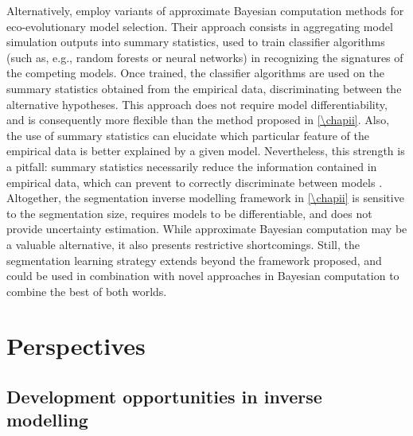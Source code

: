 % 
Alternatively, \cite{Sukumaran2016,Skeels2019,Skeels2022} employ variants of approximate Bayesian computation methods \citep{Csillery2010} for eco-evolutionary model selection. Their approach consists in aggregating model simulation outputs into summary statistics, used to train classifier algorithms (such as, e.g., random forests or neural networks) in recognizing the signatures of the competing models. Once trained, the classifier algorithms are used on the summary statistics obtained from the empirical data, discriminating between the alternative hypotheses. 
% 
This approach does not require model differentiability, and is consequently more flexible than the method proposed in \cref{\chapii}. Also, the use of summary statistics can elucidate which particular feature of the empirical data is better explained by a given model. 
% 
Nevertheless, this strength is a pitfall: summary statistics necessarily reduce the information contained in empirical data, which can prevent to correctly discriminate between models \citep{Csillery2010}.
% 
Altogether, the segmentation inverse modelling framework in \cref{\chapii} is sensitive to the segmentation size, requires models to be differentiable, and does not provide uncertainty estimation. While approximate Bayesian computation may be a valuable alternative, it also presents restrictive shortcomings. Still, the segmentation learning strategy extends beyond the framework proposed, and could be used in combination with novel approaches in Bayesian computation to combine the best of both worlds.

\section{Perspectives}

\subsection{Development opportunities in inverse modelling}

